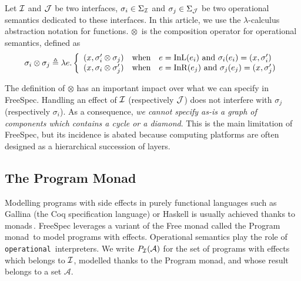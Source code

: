 \begin{definition} \label{def:freespec:semantics-composition} Let $\mathcal{I}$ and $\mathcal{J}$ be
  two interfaces, $\sigma_i \in \Sigma_{\mathcal{I}}$ and $\sigma_j \in \Sigma_{\mathcal{J}}$ be
  two operational semantics dedicated to these interfaces.
  In this article, we use the $\lambda$-calculus abstraction notation for
  functions.
  $\otimes$~is the composition operator for operational semantics, defined as
  \[ \sigma_i \otimes \sigma_j \triangleq \lambda e. \left \{
      \begin{array}{lcl}
        (x, \sigma_i' \otimes \sigma_j) & \text{when} & e =
                                                        \mathrm{InL}(e_i)
                                                        \text{ and }
                                                        \sigma_i(e_i)
                                                        = (x,
                                                        \sigma_i') \\
        (x, \sigma_i \otimes \sigma_j') & \text{when} & e =
                                                        \mathrm{InR}(e_j)
                                                        \text{ and }
                                                        \sigma_j(e_j)
                                                        = (x, \sigma_j')
      \end{array}
    \right.
  \]
\end{definition}

The definition of $\otimes$ has an important impact over what we can specify in
FreeSpec.
%
%
Handling an effect of $\mathcal{I}$ (respectively $\mathcal{J}$) does not interfere with
$\sigma_j$ (respectively $\sigma_i$).
%
As a consequence, \emph{we cannot specify as-is a graph of components which
  contains a cycle or a diamond}.
%
This is the main limitation of FreeSpec, but its incidence is abated because
computing platforms are often designed as a hierarchical succession of layers.

\subsection{The Program Monad}

Modelling programs with side effects in purely functional languages such as
{\textsc Gallina} (the Coq specification language) or Haskell is usually
achieved thanks to monads\,\cite{hoareetal2001monad}.
%
FreeSpec leverages a variant of the Free monad called the Program
monad\,\cite{operational} to model programs with effects. Operational semantics
play the role of \texttt{operational}\,\cite{operational} interpreters.
%
We write $P_{\mathcal{I}}(\mathcal{A})$ for the set of programs with effects which
belongs to $\mathcal{I}$, modelled thanks to the Program monad, and whose result belongs
to a set $\mathcal{A}$.

